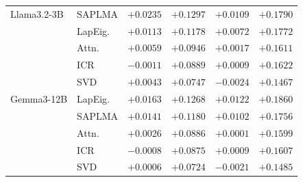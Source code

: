 \begin{table}[h]
\begin{tabular}{l l c c c c}
    \hline
    Llama3.2-3B & SAPLMA & $+0.0235$ & $+0.1297$ & $+0.0109$ & $+0.1790$ \\
     & LapEig. & $+0.0113$ & $+0.1178$ & $+0.0072$ & $+0.1772$ \\
     & Attn. & $+0.0059$ & $+0.0946$ & $+0.0017$ & $+0.1611$ \\
     & ICR & $-0.0011$ & $+0.0889$ & $+0.0009$ & $+0.1622$ \\
     & SVD & $+0.0043$ & $+0.0747$ & $-0.0024$ & $+0.1467$ \\
    \hline
    Gemma3-12B & LapEig. & $+0.0163$ & $+0.1268$ & $+0.0122$ & $+0.1860$ \\
     & SAPLMA & $+0.0141$ & $+0.1180$ & $+0.0102$ & $+0.1756$ \\
     & Attn. & $+0.0026$ & $+0.0886$ & $+0.0001$ & $+0.1599$ \\
     & ICR & $-0.0008$ & $+0.0875$ & $+0.0009$ & $+0.1607$ \\
     & SVD & $+0.0006$ & $+0.0724$ & $-0.0021$ & $+0.1485$ \\
    \hline
  \end{tabular}\end{table}
